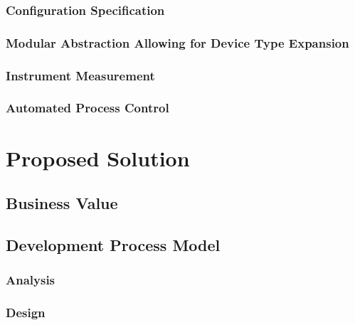 \documentclass[11pt]{article}
\begin{document}
      \subsubsection{Configuration Specification}
        \label{sec:desc-domain-conf}

      \subsubsection{Modular Abstraction Allowing for Device Type Expansion}
        \label{sec:desc-domain-mod}

      \subsubsection{Instrument Measurement}
        \label{sec:desc-domain-instr}

      \subsubsection{Automated Process Control}
        \label{sec:desc-domain-ctrl}

  \section{Proposed Solution}
    \label{sec:soln}

    \subsection{Business Value}
      \label{sec:soln-val}

    \subsection{Development Process Model}
      \label{sec:soln-model}

      \subsubsection{Analysis}
        \label{sec:soln-model-analysis}

      \subsubsection{Design}
        \label{sec:soln-model-design}
\end{document}
